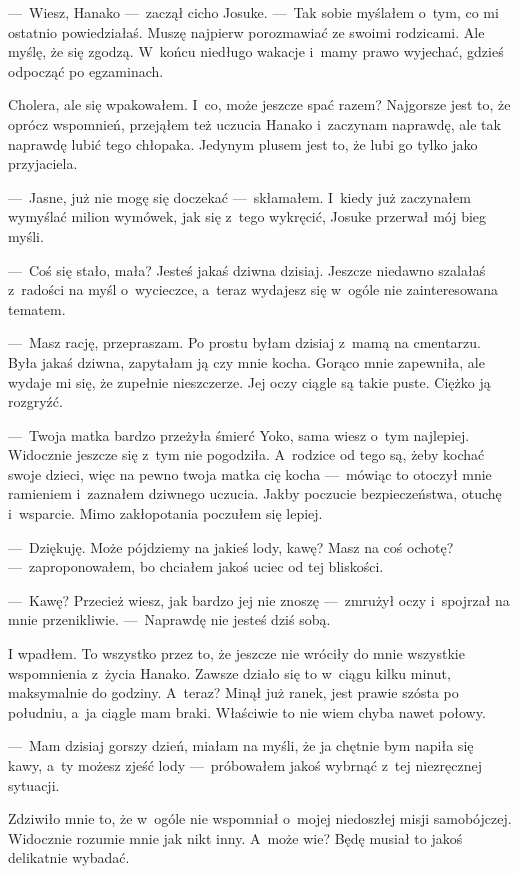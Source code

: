 ---~Wiesz, Hanako ---~zaczął cicho Josuke. ---~Tak sobie myślałem o~tym, co mi ostatnio powiedziałaś. Muszę najpierw porozmawiać ze swoimi rodzicami. Ale myślę, że się zgodzą. W~końcu niedługo wakacje i~mamy prawo wyjechać, gdzieś odpocząć po egzaminach. 

Cholera, ale się wpakowałem. I~co, może jeszcze spać razem? Najgorsze jest to, że oprócz wspomnień, przejąłem też uczucia Hanako i~zaczynam naprawdę, ale tak naprawdę lubić tego chłopaka. Jedynym plusem jest to, że lubi go tylko jako przyjaciela. 

---~Jasne, już nie mogę się doczekać ---~skłamałem. I~kiedy już zaczynałem wymyślać milion wymówek, jak się z~tego wykręcić, Josuke przerwał mój bieg myśli.

---~Coś się stało, mała? Jesteś jakaś dziwna dzisiaj. Jeszcze niedawno szalałaś z~radości na myśl o~wycieczce, a~teraz wydajesz się w~ogóle nie zainteresowana tematem.

---~Masz rację, przepraszam. Po prostu  byłam dzisiaj z~mamą na cmentarzu. Była jakaś dziwna, zapytałam ją czy mnie kocha. Gorąco mnie zapewniła, ale wydaje mi się, że zupełnie nieszczerze. Jej oczy ciągle są takie puste. Ciężko ją rozgryźć.

---~Twoja matka bardzo przeżyła śmierć Yoko, sama wiesz o~tym najlepiej. Widocznie jeszcze się z~tym nie pogodziła. A~rodzice od tego są, żeby kochać swoje dzieci, więc na pewno twoja matka cię kocha ---~mówiąc to otoczył mnie ramieniem i~zaznałem dziwnego uczucia. Jakby poczucie bezpieczeństwa, otuchę i~wsparcie. Mimo zakłopotania poczułem się lepiej. 

---~Dziękuję. Może pójdziemy na jakieś lody, kawę? Masz na coś ochotę? ---~zaproponowałem, bo chciałem jakoś uciec od tej bliskości.

---~Kawę? Przecież wiesz, jak bardzo jej nie znoszę ---~zmrużył oczy i~spojrzał na mnie przenikliwie. ---~Naprawdę nie jesteś dziś sobą.

I wpadłem. To wszystko przez to, że jeszcze nie wróciły do mnie wszystkie wspomnienia z~życia Hanako. Zawsze działo się to w~ciągu kilku minut, maksymalnie do godziny. A~teraz? Minął już ranek, jest prawie szósta po południu, a~ja ciągle mam braki. Właściwie to nie wiem chyba nawet połowy. 

---~Mam dzisiaj gorszy dzień, miałam na myśli, że ja chętnie bym napiła się kawy, a~ty możesz zjeść lody ---~próbowałem jakoś wybrnąć z~tej niezręcznej sytuacji.

Zdziwiło mnie to, że w~ogóle nie wspomniał o~mojej niedoszłej misji samobójczej. Widocznie rozumie mnie jak nikt inny. A~może wie? Będę musiał to jakoś delikatnie wybadać.

